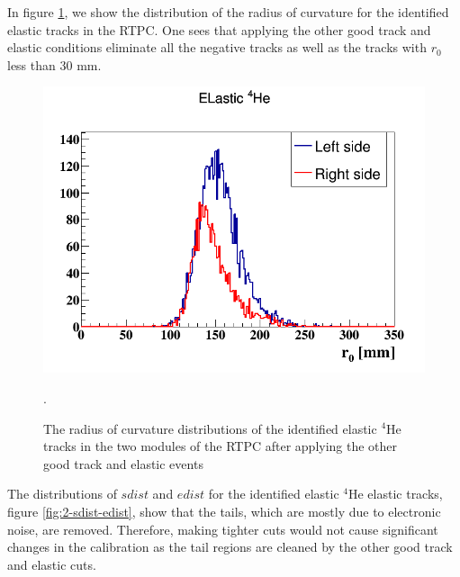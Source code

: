 In figure \ref{fig:2-r0}, we show the distribution of the radius of curvature 
for the identified elastic tracks in the RTPC. One sees that applying the other 
good track and elastic conditions eliminate all the negative tracks as well as
the tracks with $r_{0}$ less than 30 mm.
\begin{figure}[tp]
   \centering
\includegraphics[scale=0.34]{fig_rtpc/updates/r0_elastic_1p2GeV.png}
\caption{The radius of curvature distributions of the identified elastic 
$^{4}$He tracks in the two modules of the RTPC after applying the other good 
track and elastic events}.
\label{fig:2-r0}
\end{figure} 

The distributions of $sdist$ and $edist$ for the identified elastic $^4$He 
elastic tracks, figure \ref{fig:2-sdist-edist}, show that the tails, 
which are mostly due to electronic noise, are removed. Therefore, making 
tighter cuts would not cause significant changes in the calibration as the 
tail regions are cleaned by the other good track and elastic cuts.

